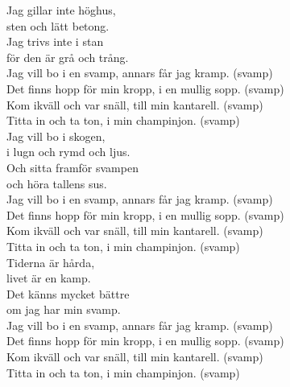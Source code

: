 \documentclass[a6paper, 10pt, twoside]{article}
\begin{document}
\begin{center}
\end{center}
\begin{lyrics}
\small Jag gillar inte höghus,\\
sten och lätt betong.\\
Jag trivs inte i stan\\
för den är grå och trång.
\vspace{5pt}\\
Jag vill bo i en svamp, annars får jag kramp. (svamp)\\
Det finns hopp för min kropp, i en mullig sopp. (svamp)\\
Kom ikväll och var snäll, till min kantarell. (svamp)\\
Titta in och ta ton, i min champinjon. (svamp)
\vspace{5pt}\\
Jag vill bo i skogen,\\
i lugn och rymd och ljus.\\
Och sitta framför svampen\\
och höra tallens sus.
\vspace{5pt}\\
Jag vill bo i en svamp, annars får jag kramp. (svamp)\\
Det finns hopp för min kropp, i en mullig sopp. (svamp)\\
Kom ikväll och var snäll, till min kantarell. (svamp)\\
Titta in och ta ton, i min champinjon. (svamp)
\vspace{5pt}\\
Tiderna är hårda,\\
livet är en kamp.\\
Det känns mycket bättre\\
om jag har min svamp.
\vspace{5pt}\\
Jag vill bo i en svamp, annars får jag kramp. (svamp)\\
Det finns hopp för min kropp, i en mullig sopp. (svamp)\\
Kom ikväll och var snäll, till min kantarell. (svamp)\\
Titta in och ta ton, i min champinjon. (svamp)
\vspace{5pt}\\
\end{lyrics}
\end{document}
